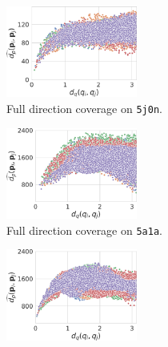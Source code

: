 \begin{figure}
    \begin{minipage}[t]{0.99\linewidth}
        \begin{subfigure}[t]{0.33\textwidth}
            \centering
            \includegraphics[height=3cm]{figures/dPdQ_5j0n_euclidean3.pdf}
            \caption{Full direction coverage on \texttt{5j0n}.}%
            \label{fig:euclidean-not-robust:5j0n-full}
        \end{subfigure}
        \hfill
        \begin{subfigure}[t]{0.33\textwidth}
            \centering
            \includegraphics[height=3cm]{figures/dPdQ_5a1a_full_euclidean3.pdf}
            \caption{Full direction coverage on \texttt{5a1a}.}%
            \label{fig:euclidean-not-robust:5a1a-full}
        \end{subfigure}
        \hfill
        \begin{subfigure}[t]{0.33\textwidth}
            \centering
            \includegraphics[height=3cm]{figures/dPdQ_5a1a_euclidean3.pdf}

\end{subfigure}
\end{minipage}
\end{figure}
